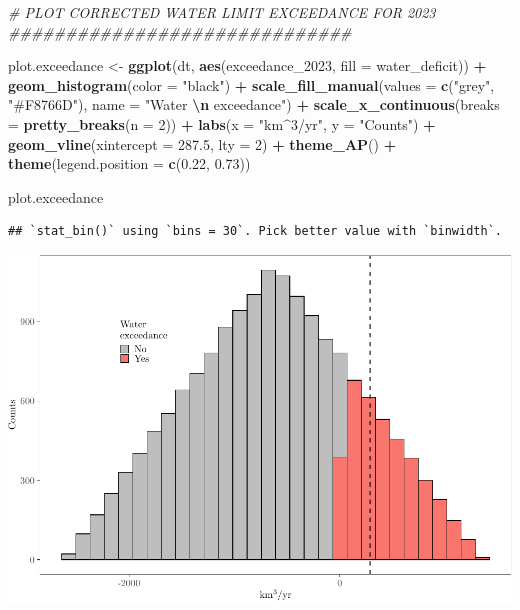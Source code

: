 \documentclass[
  11pt,
]{article}
\newenvironment{Shaded}{\begin{snugshade}}{\end{snugshade}}
\newcommand{\AttributeTok}[1]{\textcolor[rgb]{0.13,0.29,0.53}{#1}}
\newcommand{\CommentTok}[1]{\textcolor[rgb]{0.56,0.35,0.01}{\textit{#1}}}
\newcommand{\DecValTok}[1]{\textcolor[rgb]{0.00,0.00,0.81}{#1}}
\newcommand{\FloatTok}[1]{\textcolor[rgb]{0.00,0.00,0.81}{#1}}
\newcommand{\FunctionTok}[1]{\textcolor[rgb]{0.13,0.29,0.53}{\textbf{#1}}}
\newcommand{\NormalTok}[1]{#1}
\newcommand{\OtherTok}[1]{\textcolor[rgb]{0.56,0.35,0.01}{#1}}
\newcommand{\SpecialCharTok}[1]{\textcolor[rgb]{0.81,0.36,0.00}{\textbf{#1}}}
\newcommand{\StringTok}[1]{\textcolor[rgb]{0.31,0.60,0.02}{#1}}
\begin{document}
\begin{Shaded}
\begin{Highlighting}[]
\CommentTok{\# PLOT CORRECTED WATER LIMIT EXCEEDANCE FOR 2023 \#\#\#\#\#\#\#\#\#\#\#\#\#\#\#\#\#\#\#\#\#\#\#\#\#\#\#\#\#\#}

\NormalTok{plot.exceedance }\OtherTok{\textless{}{-}} \FunctionTok{ggplot}\NormalTok{(dt, }\FunctionTok{aes}\NormalTok{(exceedance\_2023, }\AttributeTok{fill =}\NormalTok{ water\_deficit)) }\SpecialCharTok{+}
  \FunctionTok{geom\_histogram}\NormalTok{(}\AttributeTok{color =} \StringTok{"black"}\NormalTok{) }\SpecialCharTok{+}
  \FunctionTok{scale\_fill\_manual}\NormalTok{(}\AttributeTok{values =} \FunctionTok{c}\NormalTok{(}\StringTok{"grey"}\NormalTok{, }\StringTok{"\#F8766D"}\NormalTok{), }
                    \AttributeTok{name =} \StringTok{"Water }\SpecialCharTok{\textbackslash{}n}\StringTok{ exceedance"}\NormalTok{) }\SpecialCharTok{+}
  \FunctionTok{scale\_x\_continuous}\NormalTok{(}\AttributeTok{breaks =} \FunctionTok{pretty\_breaks}\NormalTok{(}\AttributeTok{n =} \DecValTok{2}\NormalTok{)) }\SpecialCharTok{+}
  \FunctionTok{labs}\NormalTok{(}\AttributeTok{x =} \StringTok{"km$\^{}3$/yr"}\NormalTok{, }\AttributeTok{y =} \StringTok{"Counts"}\NormalTok{) }\SpecialCharTok{+}
  \FunctionTok{geom\_vline}\NormalTok{(}\AttributeTok{xintercept =} \FloatTok{287.5}\NormalTok{, }\AttributeTok{lty =} \DecValTok{2}\NormalTok{) }\SpecialCharTok{+}
  \FunctionTok{theme\_AP}\NormalTok{() }\SpecialCharTok{+}
  \FunctionTok{theme}\NormalTok{(}\AttributeTok{legend.position =} \FunctionTok{c}\NormalTok{(}\FloatTok{0.22}\NormalTok{, }\FloatTok{0.73}\NormalTok{))}

\NormalTok{plot.exceedance}
\end{Highlighting}
\end{Shaded}

\begin{verbatim}
## `stat_bin()` using `bins = 30`. Pick better value with `binwidth`.
\end{verbatim}

\includegraphics{code_fallacies_water_crisis_files/figure-latex/rest-5.pdf}
\end{document}
